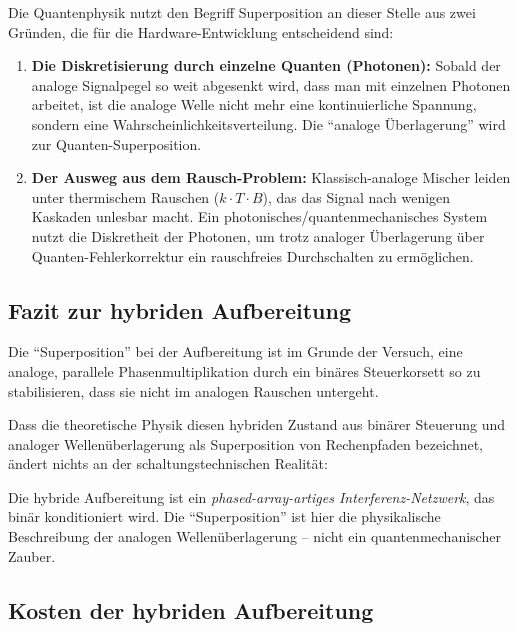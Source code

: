 Die Quantenphysik nutzt den Begriff Superposition an dieser Stelle aus
zwei Gründen, die für die Hardware-Entwicklung entscheidend sind:

\begin{enumerate}
  \item \textbf{Die Diskretisierung durch einzelne Quanten (Photonen):}
    Sobald der analoge Signalpegel so weit abgesenkt wird, dass man mit
    einzelnen Photonen arbeitet, ist die analoge Welle nicht mehr eine
    kontinuierliche Spannung, sondern eine Wahrscheinlichkeitsverteilung.
    Die ``analoge Überlagerung'' wird zur Quanten-Superposition.
  \item \textbf{Der Ausweg aus dem Rausch-Problem:}
    Klassisch-analoge Mischer leiden unter thermischem Rauschen
    ($k \cdot T \cdot B$), das das Signal nach wenigen Kaskaden
    unlesbar macht. Ein photonisches/quantenmechanisches System nutzt
    die Diskretheit der Photonen, um trotz analoger Überlagerung über
    Quanten-Fehlerkorrektur ein rauschfreies Durchschalten zu ermöglichen.
\end{enumerate}

\subsection{Fazit zur hybriden Aufbereitung}

Die ``Superposition'' bei der Aufbereitung ist im Grunde der Versuch,
eine analoge, parallele Phasenmultiplikation durch ein binäres
Steuerkorsett so zu stabilisieren, dass sie nicht im analogen Rauschen
untergeht.

Dass die theoretische Physik diesen hybriden Zustand aus binärer
Steuerung und analoger Wellenüberlagerung als Superposition von
Rechenpfaden bezeichnet, ändert nichts an der schaltungstechnischen
Realität:

\begin{keyresult}[Hybride Aufbereitung = binär gesteuertes Interferenznetzwerk]
Die hybride Aufbereitung ist ein \emph{phased-array-artiges
Interferenz-Netzwerk}, das binär konditioniert wird. Die
``Superposition'' ist hier die physikalische Beschreibung der analogen
Wellenüberlagerung -- nicht ein quantenmechanischer Zauber.
\end{keyresult}

\subsection{Kosten der hybriden Aufbereitung}

